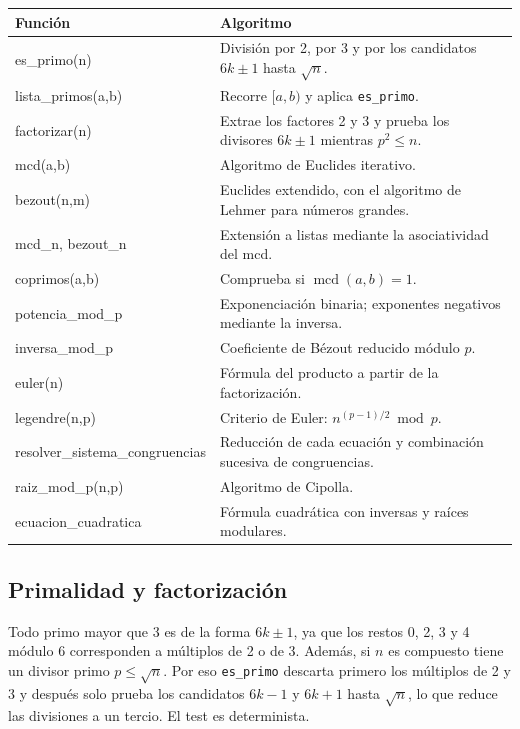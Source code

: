 \documentclass[11pt,a4paper]{article}
\renewcommand{\ttfamily}{\fontencoding{OT1}\fontfamily{cmtt}\selectfont}
\newcommand{\code}[1]{\texttt{#1}}
\begin{document}
\begin{center}
\small
\begin{tabularx}{\linewidth}{@{}>{\ttfamily}l X@{}}
\toprule
\normalfont\textbf{Función} & \textbf{Algoritmo} \\
\midrule
es\_primo(n) & División por 2, por 3 y por los candidatos $6k\pm1$ hasta $\sqrt{n}$. \\
lista\_primos(a,b) & Recorre $[a,b)$ y aplica \code{es\_primo}. \\
factorizar(n) & Extrae los factores 2 y 3 y prueba los divisores $6k\pm1$ mientras $p^2\le n$. \\
mcd(a,b) & Algoritmo de Euclides iterativo. \\
bezout(n,m) & Euclides extendido, con el algoritmo de Lehmer para números grandes. \\
mcd\_n, bezout\_n & Extensión a listas mediante la asociatividad del mcd. \\
coprimos(a,b) & Comprueba si $\operatorname{mcd}(a,b)=1$. \\
potencia\_mod\_p & Exponenciación binaria; exponentes negativos mediante la inversa. \\
inversa\_mod\_p & Coeficiente de Bézout reducido módulo $p$. \\
euler(n) & Fórmula del producto a partir de la factorización. \\
legendre(n,p) & Criterio de Euler: $n^{(p-1)/2} \bmod p$. \\
resolver\_sistema\_congruencias & Reducción de cada ecuación y combinación sucesiva de congruencias. \\
raiz\_mod\_p(n,p) & Algoritmo de Cipolla. \\
ecuacion\_cuadratica & Fórmula cuadrática con inversas y raíces modulares. \\
\bottomrule
\end{tabularx}
\end{center}

\subsection{Primalidad y factorización}

Todo primo mayor que 3 es de la forma $6k\pm1$, ya que los restos 0, 2, 3 y 4 módulo 6 corresponden a múltiplos de 2 o de 3. Además, si $n$ es compuesto tiene un divisor primo $p\le\sqrt{n}$. Por eso \code{es\_primo} descarta primero los múltiplos de 2 y 3 y después solo prueba los candidatos $6k-1$ y $6k+1$ hasta $\sqrt{n}$, lo que reduce las divisiones a un tercio. El test es determinista.
\end{document}
